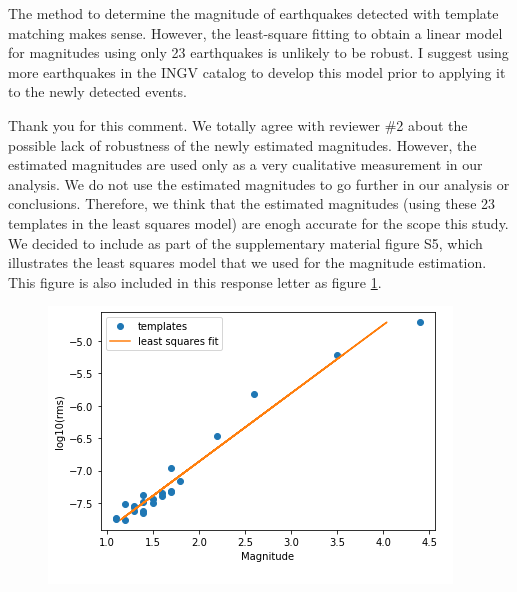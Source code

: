 \documentclass[10pt]{extarticle}
\begin{document}
\begin{Answer}
 \WorkInProgressRevTask
\end{Answer}
%
%



\begin{ReviewerComment}{2}
\noindent 
The method to determine the magnitude of earthquakes detected with template matching makes sense. However, the least-square fitting to obtain a linear model for magnitudes using only 23 earthquakes is unlikely to be robust. I suggest using more earthquakes in the INGV catalog to develop this model prior to applying it to the newly detected events.

\end{ReviewerComment}


\begin{Answer}
Thank you for this comment. We totally agree with reviewer \#2 about the possible lack of robustness of the newly estimated magnitudes. However, the estimated magnitudes are used only as a very cualitative measurement in our analysis. We do not use the estimated magnitudes to go further in our analysis or conclusions. Therefore, we think that the estimated magnitudes (using these 23 templates in the least squares model) are enogh accurate for the scope this study. We decided to include as part of the supplementary material figure S5, which illustrates the least squares model that we used for the magnitude estimation. This figure is also included in this response letter as figure \ref{fig:S5_lsq_model}.
\begin{figure}[!h]
\begin{center}
 \includegraphics[width=0.7\linewidth]{S5_lsq_model.png} 
\end{center}
\label{fig:S5_lsq_model}
\end{figure}
 \WorkInProgressRevTask
\end{Answer}
%
%
\end{document}
